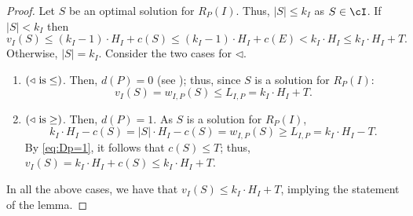 \begin{proof}
	Let $S$ be an optimal solution for $R_P(I)$. Thus, $|S| \leq k_I$ as $S \in \cI$. If $|S| < k_I$ then
	 \begin{equation*}
			v_I(S) \leq (k_I-1) \cdot H_I+c(S) \leq (k_I-1) \cdot H_I+c(E) <k_I \cdot H_I \leq k_I \cdot H_I+T.
		\end{equation*}
	Otherwise, $|S| = k_I$. Consider the two cases for $\triangleleft$.
			\begin{enumerate}
		\item $(\triangleleft \textnormal{ is}   \leq)$. Then, $d(P) = 0$ (see ); thus, since $S$ is a solution for $R_P(I)$: $$v_I(S) = w_{I,P}(S) \leq L_{I,P} = k_I \cdot H_I+T.$$ 
		\item $(\triangleleft \textnormal{ is}   \geq)$. Then, $d(P) = 1$. As $S$ is a solution for $R_P(I)$,
		\begin{equation}
			\label{eq:Dp=1}
			  k_I \cdot H_I-c(S)=|S|\cdot H_I-c(S) =w_{I,P}(S) \geq L_{I,P} = k_I \cdot H_I-T.
		\end{equation} 
		By \eqref{eq:Dp=1}, it follows that $c(S) \leq T$; thus, $	v_I(S) = k_I \cdot H_I+c(S) \leq k_I \cdot H_I+T$. 
	\end{enumerate} 
	
In all the above cases, we have that $v_I(S) \leq k_I \cdot H_I+T$, implying the statement of the lemma. 
\end{proof}

